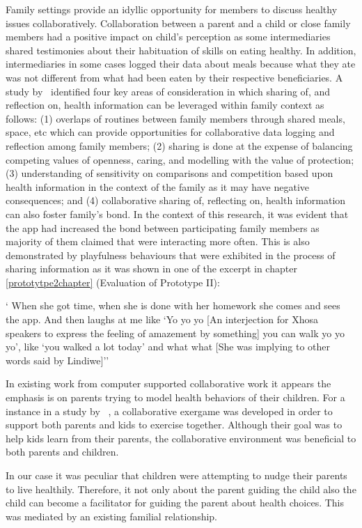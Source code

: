 Family settings provide an idyllic opportunity for members to discuss healthy issues collaboratively. Collaboration between a parent and a child or close family members had a positive impact on child's perception as some intermediaries shared testimonies about their habituation of skills on eating healthy. In addition, intermediaries in some cases logged their data about meals because what they ate was not different from what had been eaten by their respective beneficiaries. A study by~\cite{grimes2009toward} identified four key areas of consideration in which sharing of, and reflection on, health information can be leveraged within family context as follows: (1) overlaps of routines between family members through shared meals, space, etc which can provide opportunities for collaborative data logging and reflection among family members; (2) sharing is done at the expense of balancing competing values of openness, caring, and modelling with the value of protection; (3) understanding of sensitivity on comparisons and competition based upon health information in the context of the family as it may have negative consequences; and (4) collaborative sharing of, reflecting on, health information can also foster family's bond. In the context of this research, it was evident that the app had increased the bond between participating family members as majority of them claimed that were interacting more often. This is also demonstrated by playfulness behaviours that were exhibited in the process of sharing information as it was shown in one of the excerpt in chapter \ref{prototytpe2chapter} (Evaluation of Prototype II):

 {` When she got time, when she is done with her homework she comes and sees the app. And then laughs at me like `Yo yo yo [An interjection for Xhosa speakers to express the feeling of amazement by something] you can walk yo yo yo', like `you walked a lot today' and what what [She was implying to other words said by Lindiwe]''}

In existing work from computer supported collaborative work it appears the emphasis is on parents trying to model health behaviors of their children.  For a instance in a study by ~\cite{saksono2015spaceship}, a collaborative exergame was developed in order to support both parents and kids to exercise together. Although their goal was to help kids learn from their parents, the collaborative environment was beneficial to both parents and children.

In our case it was peculiar that children were attempting to nudge their parents to live healthily. Therefore, it not only about the parent guiding the child also the child can become a facilitator for guiding the parent about health choices. This was mediated by an existing familial relationship. 

